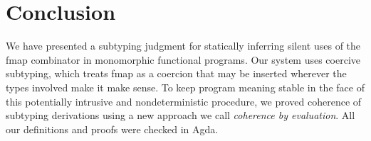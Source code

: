 \documentclass[acmsmall,screen]{acmart}
\begin{document}
\section{Conclusion}
We have presented a subtyping judgment for statically inferring silent uses of
the fmap combinator in monomorphic functional programs.  Our system uses
coercive subtyping, which treats fmap as a coercion that may be inserted
wherever the types involved make it make sense. To keep program meaning stable
in the face of this potentially intrusive and nondeterministic procedure, we
proved coherence of subtyping derivations using a new approach we call
\emph{coherence by evaluation}.  All our definitions and proofs were checked
in Agda.




\end{document}
